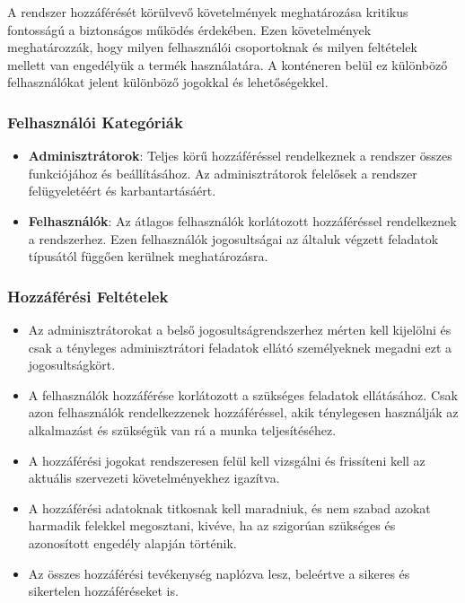 \documentclass{scrreprt}
\begin{document}
A rendszer hozzáférését körülvevő követelmények meghatározása kritikus fontosságú a biztonságos működés érdekében. Ezen követelmények meghatározzák, hogy
milyen felhasználói csoportoknak és milyen feltételek mellett van engedélyük a termék használatára. A konténeren belül ez különböző felhasználókat jelent
különböző jogokkal és lehetőségekkel.

\subsubsection{Felhasználói Kategóriák}

\begin{itemize}
      \item \textbf{Adminisztrátorok}:
            Teljes körű hozzáféréssel rendelkeznek a rendszer összes funkciójához és beállításához. Az adminisztrátorok felelősek a rendszer felügyeletéért és karbantartásáért.
      \item \textbf{Felhasználók}:
            Az átlagos felhasználók korlátozott hozzáféréssel rendelkeznek a rendszerhez. Ezen felhasználók jogosultságai az általuk végzett feladatok típusától függően kerülnek meghatározásra.
\end{itemize}

\subsubsection{Hozzáférési Feltételek}

\begin{itemize}
      \item Az adminisztrátorokat a belső jogosultságrendszerhez mérten kell kijelölni és csak a tényleges adminisztrátori feladatok ellátó személyeknek megadni ezt a
            jogosultságkört.
      \item A felhasználók hozzáférése korlátozott a szükséges feladatok ellátásához. Csak azon felhasználók rendelkezzenek hozzáféréssel, akik ténylegesen használják az
            alkalmazást és szükségük van rá a munka teljesítéséhez.
      \item A hozzáférési jogokat rendszeresen felül kell vizsgálni és frissíteni kell az aktuális szervezeti követelményekhez igazítva.
      \item A hozzáférési adatoknak titkosnak kell maradniuk, és nem szabad azokat harmadik felekkel megosztani, kivéve, ha az szigorúan szükséges és azonosított engedély
            alapján történik.
      \item Az összes hozzáférési tevékenység naplózva lesz, beleértve a sikeres és sikertelen hozzáféréseket is.
\end{itemize}
\end{document}
